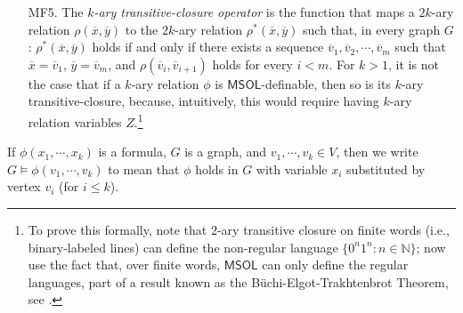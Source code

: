 \documentclass{aamas2015}
\def\nat{\mathbb{N}}
\newcommand{\tup}[1]{\overline{#1}}
\def\fol{\mathsf{FOL}}
\def\msol{\mathsf{MSOL}}
\def\fotc{\mathsf{FOL+TC}}
\newcommand{\sr}[1]{\footnote{{\color{red} Note. #1}}}
\begin{document}
\begin{enumerate}
\item[MF5.] \label{ex:ktc} The {\em $k$-ary transitive-closure operator} is the function that maps a $2k$-ary relation $\rho(\tup{x},\tup{y})$ to the $2k$-ary relation $\rho^*(\tup{x},\tup{y})$ such that, in every graph $G$: $\rho^*(\tup{x},\tup{y})$ holds if and only if there exists a sequence $\tup{v}_1, \tup{v}_2, \cdots, \tup{v}_m$ such that $\tup{x} = \tup{v}_1$, $\tup{y} = \tup{v}_m$, and $\rho(\tup{v}_i,\tup{v}_{i+1})$ holds for every $i < m$. For $k > 1$, it is not the case that if a $k$-ary relation $\phi$ is $\msol$-definable, then so is its $k$-ary transitive-closure, because, intuitively, this would require having $k$-ary relation variables $Z$.\footnote{To prove this formally, note that $2$-ary transitive closure on finite words (i.e., binary-labeled lines) can define the non-regular language $\{0^n1^n : n \in \nat\}$; now use the fact that, over finite words, $\msol$ can only define the regular languages, part of a result known as the B\"uchi-Elgot-Trakhtenbrot Theorem, see \cite{Thomas96}.}
\end{enumerate}



If $\phi(x_1,\cdots,x_k)$ is a formula, $G$ is a graph, and $v_1,\cdots,v_k \in V$, then we write $G \models \phi(v_1,\cdots,v_k)$ to mean that $\phi$ holds in $G$ with variable $x_i$ substituted by vertex $v_i$ (for $i \leq k$). 
\end{document}
